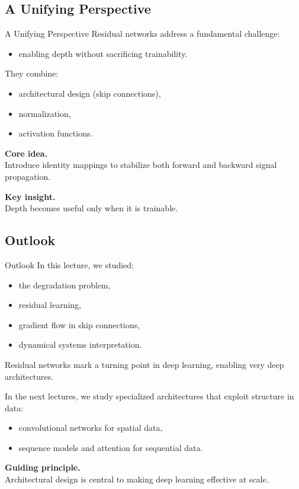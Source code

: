 \documentclass[aspectratio=169,11pt]{beamer}
\begin{document}
\subsection{A Unifying Perspective}
\begin{frame}[t,allowframebreaks]{A Unifying Perspective}
\small
Residual networks address a fundamental challenge:

\begin{itemize}
    \item enabling depth without sacrificing trainability.
\end{itemize}

They combine:

\begin{itemize}
    \item architectural design (skip connections),
    \item normalization,
    \item activation functions.
\end{itemize}

\textbf{Core idea.}\\ Introduce identity mappings to stabilize both forward and backward signal propagation.

\textbf{Key insight.}\\ Depth becomes useful only when it is trainable.
\end{frame}

\subsection{Outlook}
\begin{frame}[t,allowframebreaks]{Outlook}
\small
In this lecture, we studied:

\begin{itemize}
    \item the degradation problem,
    \item residual learning,
    \item gradient flow in skip connections,
    \item dynamical systems interpretation.
\end{itemize}

Residual networks mark a turning point in deep learning, enabling very deep architectures.

In the next lectures, we study specialized architectures that exploit structure in data:

\begin{itemize}
    \item convolutional networks for spatial data,
    \item sequence models and attention for sequential data.
\end{itemize}

\textbf{Guiding principle.}\\ Architectural design is central to making deep learning effective at scale.
\end{frame}
\end{document}
